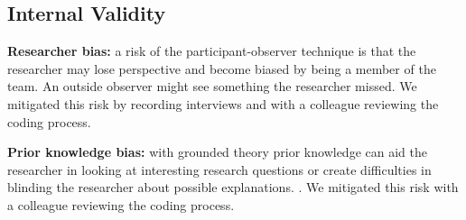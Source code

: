 \subsection{Internal Validity}
\textbf{Researcher bias:} a risk of the participant-observer technique is that the researcher may lose perspective and become biased by being a member of the team. An outside observer might see something the researcher missed. We mitigated this risk by recording interviews and with a colleague reviewing the coding process. 

\textbf{Prior knowledge bias:} with grounded theory prior knowledge can aid the researcher in looking at interesting research questions or create difficulties in blinding the researcher about possible explanations. \cite{GlaserIssues}. We mitigated this risk with a colleague reviewing the coding process. 